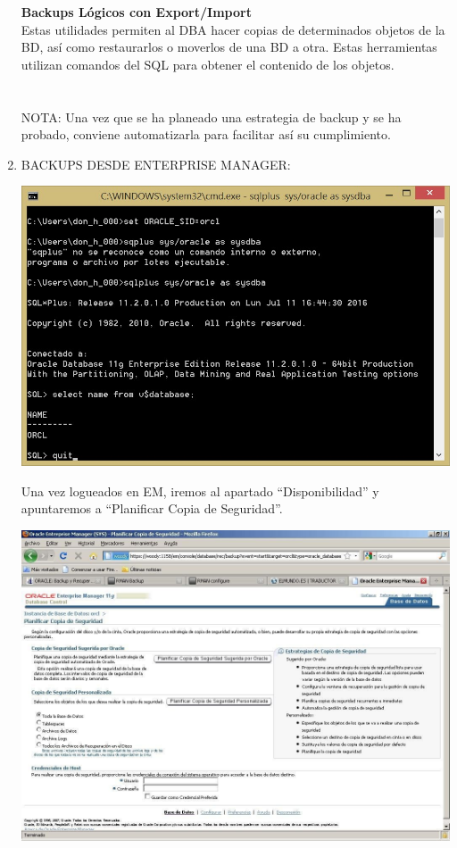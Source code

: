 \begin{enumerate}[1.]
	\textbf{Backups Lógicos con Export/Import}  
	\\Estas utilidades permiten al DBA hacer copias de determinados objetos de la BD, así como restaurarlos o moverlos de una BD a otra. Estas herramientas utilizan comandos del SQL para obtener el contenido de los objetos.\\
	\\
	\\NOTA: Una vez que se ha planeado una estrategia de backup y se ha probado, conviene automatizarla para facilitar así su cumplimiento.

	\item BACKUPS  DESDE  ENTERPRISE  MANAGER:
	
\begin{center}
	\includegraphics[width=15cm]{./Imagenes/img-4-2-1}  
	\end{center}
	Una  vez  logueados  en  EM,  iremos  al  apartado  “Disponibilidad”  y  apuntaremos  a “Planificar  Copia de Seguridad”.
	\begin{center}
	\includegraphics[width=15cm]{./Imagenes/img-4-2-2}  

\end{center}
\end{enumerate}
